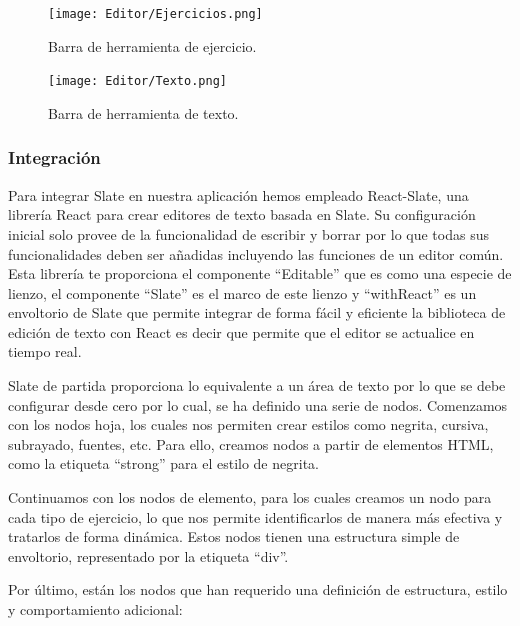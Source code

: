 \begin{figure}[h!]
  \centering
  \texttt{[image: Editor/Ejercicios.png]}
  \caption{Barra de herramienta de ejercicio.}
  \label{fig:barrraHerramientaEjercicios}
\end{figure}

\begin{figure}[h!]
  \centering
  \texttt{[image: Editor/Texto.png]}
  \caption{Barra de herramienta de texto.}
  \label{fig:barrraHerramientaTexto}
\end{figure}

\subsubsection{Integración}
Para integrar Slate en nuestra aplicación hemos empleado React-Slate, una librería React para crear editores de texto basada en Slate. Su configuración inicial solo provee de la funcionalidad de escribir y borrar por lo que todas sus funcionalidades deben ser añadidas incluyendo las funciones de un editor común. Esta librería te proporciona el componente ``Editable'' que es como una especie de lienzo,  el componente ``Slate'' es el marco de este lienzo y ``withReact'' es un envoltorio de Slate que permite integrar de forma fácil y eficiente la biblioteca de edición de texto con React es decir que permite que el editor se actualice en tiempo real.

Slate de partida proporciona lo equivalente a un área de texto por lo que se debe configurar desde cero por lo cual, se ha definido una serie de nodos. Comenzamos con los nodos hoja, los cuales nos permiten crear estilos como negrita, cursiva, subrayado, fuentes, etc. Para ello, creamos nodos a partir de elementos HTML, como la etiqueta ``strong'' para el estilo de negrita.

Continuamos con los nodos de elemento, para los cuales creamos un nodo para cada tipo de ejercicio, lo que nos permite identificarlos de manera más efectiva y tratarlos de forma dinámica. Estos nodos tienen una estructura simple de envoltorio, representado por la etiqueta ``div''.

Por último, están los nodos que han requerido una definición de estructura, estilo y comportamiento adicional:

